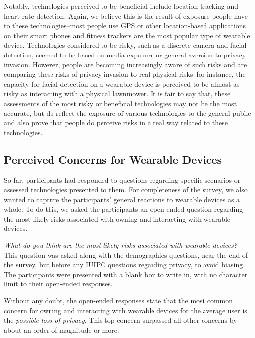 \documentclass{acm_proc_article-sp}
\begin{document}
Notably, technologies perceived to be beneficial include location tracking and heart rate detection. Again, we believe this is the result of exposure people have to these technologies--most people use GPS or other location-based applications on their smart phones and fitness trackers are the most popular type of wearable device. Technologies considered to be risky, such as a discrete camera and facial detection, seemed to be based on media exposure or general aversion to privacy invasion. However, people are becoming increasingly aware of such risks and are comparing these risks of privacy invasion to real physical risks--for instance, the capacity for facial detection on a wearable device is perceived to be almost as risky as interacting with a physical lawnmower. It is fair to say that, these assessments of the most risky or beneficial technologies may not be the most accurate, but do reflect the exposure of various technologies to the general public and also prove that people do perceive risks in a real way related to these technologies. 

\subsection{Perceived Concerns for Wearable Devices}
So far, participants had responded to questions regarding specific scenarios or assessed technologies presented to them. For completeness of the survey, we also wanted to capture the participants' general reactions to wearable devices as a whole. To do this, we asked the participants an open-ended question regarding the most likely risks associated with owning and interacting with wearable devices.

\textit{What do you think are the most likely risks associated with wearable devices?}\\[-.5cm]

This question was asked along with the demographics questions, near the end of the survey, but before any IUIPC questions regarding privacy, to avoid biasing. The participants were presented with a blank box to write in, with no character limit to their open-ended responses. 

Without any doubt, the open-ended responses state that the most common concern for owning and interacting with wearable devices for the average user is the \textit{possible loss of privacy}. This top concern surpassed all other concerns by about an order of magnitude or more:
\end{document}
